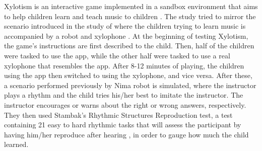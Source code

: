 Xylotism is an interactive game implemented in a sandbox environment that aims to help children learn and teach music to children \cite{elahi2017xylotism}. The study tried to mirror the scenario introduced in the study of  where the children trying to learn music is accompanied by a robot and xylophone \cite{taheri2016social}. At the beginning of testing Xylotism, the game's instructions are first described to the child. Then, half of the children were tasked to use the app, while the other half were tasked to use a real xylophone that resembles the app. After 8-12 minutes of playing, the children using the app then switched to using the xylophone, and vice versa. After these, a scenario performed previously by Nima robot \cite{taheri2016social} is simulated, where the instructor plays a rhythm and the child tries his/her best to imitate the instructor. The instructor encourages or warns about the right or wrong answers, respectively. They then used Stambak’s Rhythmic Structures Reproduction test, a test containing 21 easy to hard rhythmic tasks that will assess the participant by having him/her reproduce after hearing \cite{gardner1971children}, in order to gauge how much the child learned.

